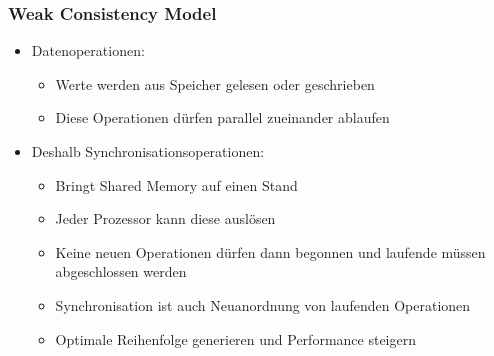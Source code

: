 \documentclass{sikslides}
\begin{document}
\begin{frame}
	\frametitle{Weak Consistency Model}
	\begin{itemize}
		\item Datenoperationen: \bigskip
		\begin{itemize}
			\item Werte werden aus Speicher gelesen oder geschrieben \bigskip
			\item Diese Operationen dürfen parallel zueinander ablaufen \bigskip
		\end{itemize}
		\item Deshalb Synchronisationsoperationen: \bigskip
			\begin{itemize}
			\item Bringt Shared Memory auf einen Stand \bigskip
			\item Jeder Prozessor kann diese auslösen \bigskip
			\item Keine neuen Operationen dürfen dann begonnen und laufende müssen abgeschlossen werden \bigskip
			\item Synchronisation ist auch Neuanordnung von laufenden Operationen \bigskip
			\item Optimale Reihenfolge generieren und Performance steigern
			\end{itemize}
	\end{itemize}
\end{frame}
\end{document}
